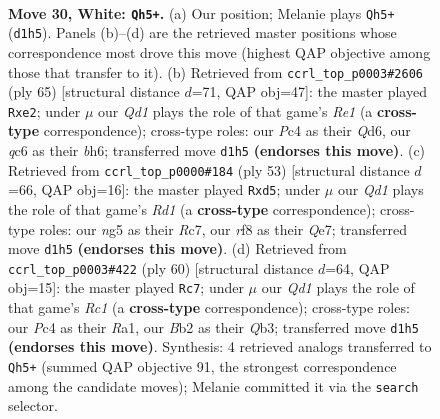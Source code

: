 \documentclass[11pt]{article}
\begin{document}
\clearpage

\begin{figure}[p]\centering
\begin{subfigure}{0.46\textwidth}\centering
\resizebox{\linewidth}{!}{%
\newchessgame
\chessboard[
  setfen={3r1r1k/8/1pq5/p1p1bpn1/2P2R2/1P5p/PB1P4/1R1Q2K1 w - - 0 30},
  showmover=false,
  pgfstyle=straightmove, color=movearrow, markmove={d1-h5}
]}
\caption{}
\end{subfigure}\hfill
\begin{subfigure}{0.46\textwidth}\centering
\resizebox{\linewidth}{!}{%
\newchessgame
\chessboard[
  setfen={4r1k1/7p/p1pq3B/3r1bP1/1P1P1p2/5Q2/P3RP2/3R2K1 b - - 4 33},
  showmover=false,
  pgfstyle=straightmove, color=movearrow, markmove={e8-e2}
]}
\caption{}
\end{subfigure}
\\[4pt]
\begin{subfigure}{0.46\textwidth}\centering
\resizebox{\linewidth}{!}{%
\newchessgame
\chessboard[
  setfen={3r2k1/ppr1qp1p/6p1/P2BP3/3P1R2/3Q2P1/7P/3R2K1 b - - 0 27},
  showmover=false,
  pgfstyle=straightmove, color=movearrow, markmove={d8-d5}
]}
\caption{}
\end{subfigure}\hfill
\begin{subfigure}{0.46\textwidth}\centering
\resizebox{\linewidth}{!}{%
\newchessgame
\chessboard[
  setfen={r2r2k1/1p3p2/5b1p/1q4p1/1B6/pQ2PP1P/P5P1/R1R3K1 w - - 0 31},
  showmover=false,
  pgfstyle=straightmove, color=movearrow, markmove={c1-c7}
]}
\caption{}
\end{subfigure}
\caption{\textbf{Move 30, White: \texttt{Qh5+}.} (a) Our position; Melanie plays \texttt{Qh5+} (\texttt{d1h5}). Panels (b)--(d) are the retrieved master positions whose correspondence most drove this move (highest QAP objective among those that transfer to it). (b) Retrieved from \texttt{ccrl\_top\_p0003\#2606} (ply 65) [structural distance $d$=71, QAP obj=47]: the master played \texttt{Rxe2}; under $\mu$ our \emph{Qd1} plays the role of that game's \emph{Re1} (a \textbf{cross-type} correspondence); cross-type roles: our \emph{P}c4 as their \emph{Q}d6, our \emph{q}c6 as their \emph{b}h6; transferred move \texttt{d1h5} \textbf{(endorses this move)}. (c) Retrieved from \texttt{ccrl\_top\_p0000\#184} (ply 53) [structural distance $d$=66, QAP obj=16]: the master played \texttt{Rxd5}; under $\mu$ our \emph{Qd1} plays the role of that game's \emph{Rd1} (a \textbf{cross-type} correspondence); cross-type roles: our \emph{n}g5 as their \emph{R}c7, our \emph{r}f8 as their \emph{Q}e7; transferred move \texttt{d1h5} \textbf{(endorses this move)}. (d) Retrieved from \texttt{ccrl\_top\_p0003\#422} (ply 60) [structural distance $d$=64, QAP obj=15]: the master played \texttt{Rc7}; under $\mu$ our \emph{Qd1} plays the role of that game's \emph{Rc1} (a \textbf{cross-type} correspondence); cross-type roles: our \emph{P}c4 as their \emph{R}a1, our \emph{B}b2 as their \emph{Q}b3; transferred move \texttt{d1h5} \textbf{(endorses this move)}. Synthesis: 4 retrieved analogs transferred to \texttt{Qh5+} (summed QAP objective 91, the strongest correspondence among the candidate moves); Melanie committed it via the \texttt{search} selector.}
\label{fig:thought-m58}
\end{figure}
\end{document}
